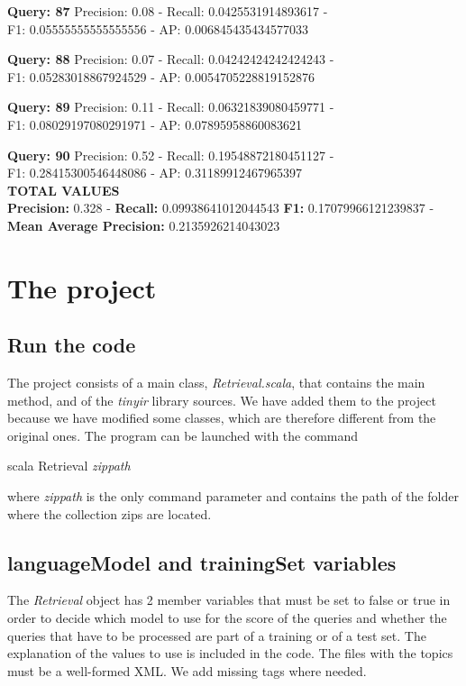 \documentclass[a4paper, 11pt]{article}
\begin{document}
\textbf{Query: 87}
Precision: 0.08 - Recall: 0.0425531914893617 - \\
F1: 0.05555555555555556 - AP:  0.006845435434577033

\textbf{Query: 88}
Precision: 0.07 - Recall: 0.04242424242424243 - \\
F1: 0.05283018867924529 - AP:  0.0054705228819152876

\textbf{Query: 89}
Precision: 0.11 - Recall: 0.06321839080459771 - \\
F1: 0.08029197080291971 - AP:  0.07895958860083621

\textbf{Query: 90}
Precision: 0.52 - Recall: 0.19548872180451127 - \\
F1: 0.28415300546448086 - AP:  0.31189912467965397\\

\textbf{TOTAL VALUES}\\

\textbf{Precision:} 0.328 - \textbf{Recall:} 0.09938641012044543 \textbf{F1:} 0.17079966121239837 -\\
 \textbf{Mean Average Precision:} 0.2135926214043023


\section{The project}

\subsection{Run the code}
The project consists of a main class, \textit{Retrieval.scala}, that contains the main method, and of the \textit{tinyir} library sources. We have added them to the project because we have modified some classes, which are therefore different from the original ones.
The program can be launched with the command

\begin{center}
scala Retrieval \textit{zippath}
\end{center}

where \textit{zippath} is the only command parameter and contains the path of the folder where the collection zips are located.

\subsection{languageModel and trainingSet variables}
The \textit{Retrieval} object has 2 member variables that must be set to false or true in order to decide which model to use for the score of the queries and whether the queries 
that have to be processed are part of a training or of a test set. The explanation of the values to use is included in the code. The files with the topics must be a well-formed XML. We add missing tags where needed.
\end{document}

